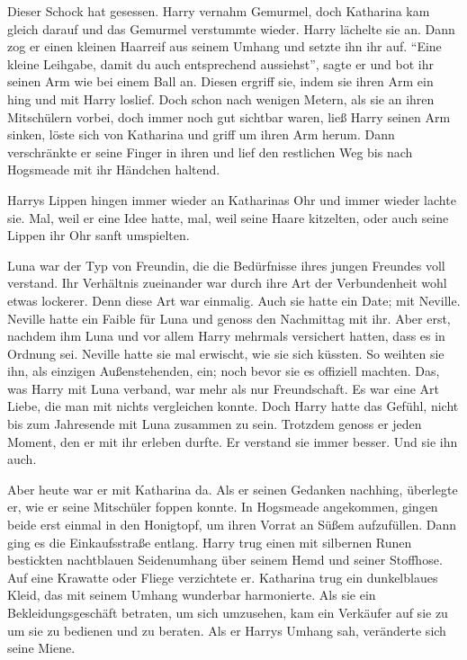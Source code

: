 Dieser Schock hat gesessen. Harry vernahm Gemurmel, doch Katharina kam gleich darauf und das Gemurmel verstummte wieder. Harry lächelte sie an.
Dann zog er einen kleinen Haarreif aus seinem Umhang und setzte ihn ihr auf. \enquote{Eine kleine Leihgabe, damit du auch entsprechend aussiehst}, sagte er und bot ihr seinen Arm wie bei einem Ball an. Diesen ergriff sie, indem sie ihren Arm ein hing und mit Harry loslief. Doch schon nach wenigen Metern, als sie an ihren Mitschülern vorbei, doch immer noch gut sichtbar waren, ließ Harry seinen Arm sinken, löste sich von Katharina und griff um ihren Arm herum. Dann verschränkte er seine Finger in ihren und lief den restlichen Weg bis nach Hogsmeade mit ihr Händchen haltend.

Harrys Lippen hingen immer wieder an Katharinas Ohr und immer wieder lachte sie. Mal, weil er eine Idee hatte, mal, weil seine Haare kitzelten, oder auch seine Lippen ihr Ohr sanft umspielten.

Luna war der Typ von Freundin, die die Bedürfnisse ihres jungen Freundes voll verstand. Ihr Verhältnis zueinander war durch ihre Art der Verbundenheit wohl etwas lockerer. Denn diese Art war einmalig. Auch sie hatte ein Date; mit Neville. Neville hatte ein Faible für Luna und genoss den Nachmittag mit ihr. Aber erst, nachdem ihm Luna und vor allem Harry mehrmals versichert hatten, dass es in Ordnung sei. Neville hatte sie mal erwischt, wie sie sich küssten. So weihten sie ihn, als einzigen Außenstehenden, ein; noch bevor sie es offiziell machten. Das, was Harry mit Luna verband, war mehr als nur Freundschaft. Es war eine Art Liebe, die man mit nichts vergleichen konnte. Doch Harry hatte das Gefühl, nicht bis zum Jahresende mit Luna zusammen zu sein. Trotzdem genoss er jeden Moment, den er mit ihr erleben durfte. Er verstand sie immer besser. Und sie ihn auch.

Aber heute war er mit Katharina da. Als er seinen Gedanken nachhing, überlegte er, wie er seine Mitschüler foppen konnte. In Hogsmeade angekommen, gingen beide erst einmal in den Honigtopf, um ihren Vorrat an Süßem aufzufüllen. Dann ging es die Einkaufsstraße entlang. Harry trug einen mit silbernen Runen bestickten nachtblauen Seidenumhang über seinem Hemd und seiner Stoffhose. Auf eine Krawatte oder Fliege verzichtete er. Katharina trug ein dunkelblaues Kleid, das mit seinem Umhang wunderbar harmonierte. Als sie ein Bekleidungsgeschäft betraten, um sich umzusehen, kam ein Verkäufer auf sie zu um sie zu bedienen und zu beraten. Als er Harrys Umhang sah, veränderte sich seine Miene.

